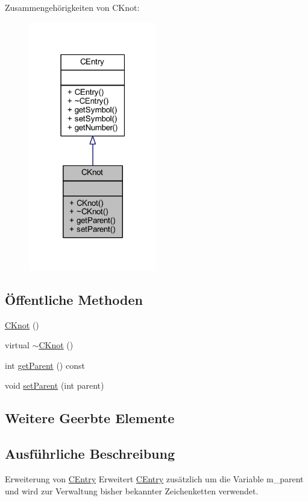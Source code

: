 Zusammengehörigkeiten von C\+Knot\+:
\nopagebreak
\begin{figure}[H]
\begin{center}
\leavevmode
\includegraphics[width=159pt]{class_c_knot__coll__graph}
\end{center}
\end{figure}
\subsection*{Öffentliche Methoden}
\begin{DoxyCompactItemize}
\item 
\hyperlink{class_c_knot_aebedf7efb952e68b564b0e56300e8135}{C\+Knot} ()
\item 
virtual \hyperlink{class_c_knot_a8752f1fc4c060fa291a850c9c36889e1}{$\sim$\+C\+Knot} ()
\item 
int \hyperlink{class_c_knot_a22a037af3ea6162ff6d380480d568b80}{get\+Parent} () const
\item 
void \hyperlink{class_c_knot_a6ad905f6be13af0bdff157559c02b909}{set\+Parent} (int parent)
\end{DoxyCompactItemize}
\subsection*{Weitere Geerbte Elemente}


\subsection{Ausführliche Beschreibung}
Erweiterung von \hyperlink{class_c_entry}{C\+Entry} Erweitert \hyperlink{class_c_entry}{C\+Entry} zusätzlich um die Variable m\+\_\+parent und wird zur Verwaltung bisher bekannter Zeichenketten verwendet. 

